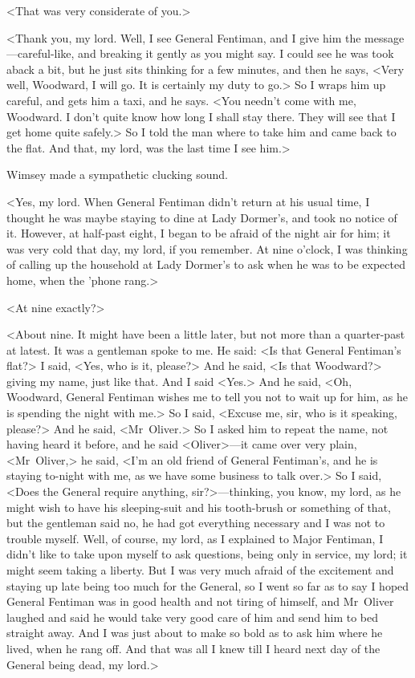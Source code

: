 <That was very considerate of you.>

<Thank you, my lord. Well, I see General Fentiman, and I give him the message—careful-like, and breaking it gently as you might say. I could see he was took aback a bit, but he just sits thinking for a few minutes, and then he says, <Very well, Woodward, I will go. It is certainly my duty to go.> So I wraps him up careful, and gets him a taxi, and he says. <You needn't come with me, Woodward. I don't quite know how long I shall stay there. They will see that I get home quite safely.> So I told the man where to take him and came back to the flat. And that, my lord, was the last time I see him.>

Wimsey made a sympathetic clucking sound.

<Yes, my lord. When General Fentiman didn't return at his usual time, I thought he was maybe staying to dine at Lady Dormer's, and took no notice of it. However, at half-past eight, I began to be afraid of the night air for him; it was very cold that day, my lord, if you remember. At nine o'clock, I was thinking of calling up the household at Lady Dormer's to ask when he was to be expected home, when the 'phone rang.>

<At nine exactly?>

<About nine. It might have been a little later, but not more than a quarter-past at latest. It was a gentleman spoke to me. He said: <Is that General Fentiman's flat?> I said, <Yes, who is it, please?> And he said, <Is that Woodward?> giving my name, just like that. And I said <Yes.> And he said, <Oh, Woodward, General Fentiman wishes me to tell you not to wait up for him, as he is spending the night with me.> So I said, <Excuse me, sir, who is it speaking, please?> And he said, <Mr~Oliver.> So I asked him to repeat the name, not having heard it before, and he said <Oliver>—it came over very plain, <Mr~Oliver,> he said, <I'm an old friend of General Fentiman's, and he is staying to-night with me, as we have some business to talk over.> So I said, <Does the General require anything, sir?>—thinking, you know, my lord, as he might wish to have his sleeping-suit and his tooth-brush or something of that, but the gentleman said no, he had got everything necessary and I was not to trouble myself. Well, of course, my lord, as I explained to Major Fentiman, I didn't like to take upon myself to ask questions, being only in service, my lord; it might seem taking a liberty. But I was very much afraid of the excitement and staying up late being too much for the General, so I went so far as to say I hoped General Fentiman was in good health and not tiring of himself, and Mr~Oliver laughed and said he would take very good care of him and send him to bed straight away. And I was just about to make so bold as to ask him where he lived, when he rang off. And that was all I knew till I heard next day of the General being dead, my lord.>

